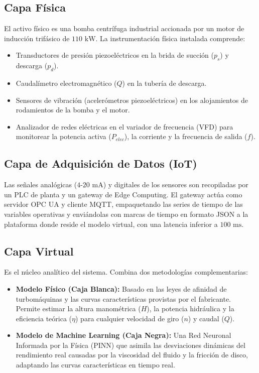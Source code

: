 \documentclass[11pt,twocolumn,a4paper]{article}
\begin{document}
\subsection{Capa Física}
El activo físico es una bomba centrífuga industrial accionada por un motor de inducción trifásico de $110\text{ kW}$. La instrumentación física instalada comprende:
\begin{itemize}
    \item Transductores de presión piezoeléctricos en la brida de succión ($p_s$) y descarga ($p_d$).
    \item Caudalímetro electromagnético ($Q$) en la tubería de descarga.
    \item Sensores de vibración (acelerómetros piezoeléctricos) en los alojamientos de rodamientos de la bomba y el motor.
    \item Analizador de redes eléctricas en el variador de frecuencia (VFD) para monitorear la potencia activa ($P_{elec}$), la corriente y la frecuencia de salida ($f$).
\end{itemize}

\subsection{Capa de Adquisición de Datos (IoT)}
Las señales analógicas ($4\text{-}20\text{ mA}$) y digitales de los sensores son recopiladas por un PLC de planta y un gateway de Edge Computing. El gateway actúa como servidor OPC UA y cliente MQTT, empaquetando las series de tiempo de las variables operativas y enviándolas con marcas de tiempo en formato JSON a la plataforma donde reside el modelo virtual, con una latencia inferior a $100\text{ ms}$.

\subsection{Capa Virtual}
Es el núcleo analítico del sistema. Combina dos metodologías complementarias:
\begin{itemize}
    \item \textbf{Modelo Físico (Caja Blanca):} Basado en las leyes de afinidad de turbomáquinas y las curvas características provistas por el fabricante. Permite estimar la altura manométrica ($H$), la potencia hidráulica y la eficiencia teórica ($\eta$) para cualquier velocidad de giro ($n$) y caudal ($Q$).
    \item \textbf{Modelo de Machine Learning (Caja Negra):} Una Red Neuronal Informada por la Física (PINN) que asimila las desviaciones dinámicas del rendimiento real causadas por la viscosidad del fluido y la fricción de disco, adaptando las curvas características en tiempo real.
\end{itemize}
\end{document}
